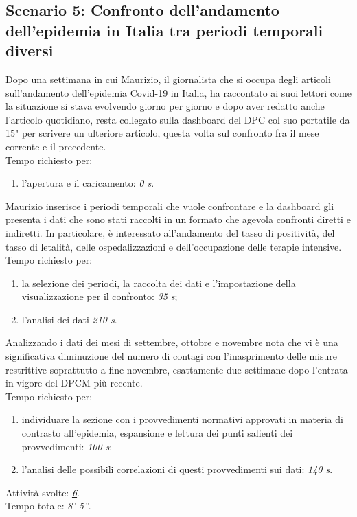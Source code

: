 \subsection{Scenario 5: Confronto dell'andamento dell'epidemia in Italia tra periodi temporali diversi}
\label{ss:scenario-5}
Dopo una settimana in cui Maurizio, il giornalista che si occupa degli articoli sull'andamento dell'epidemia Covid-19 in Italia, ha raccontato ai suoi lettori come la situazione si stava evolvendo giorno per giorno e dopo aver redatto anche l'articolo quotidiano, resta collegato sulla dashboard del DPC col suo portatile da 15" per scrivere un ulteriore articolo, questa volta sul confronto fra il mese corrente e il precedente.\\
Tempo richiesto per:
\begin{enumerate}
    \item l'apertura e il caricamento: \textit{0 s}.
\end{enumerate}

\noindent
Maurizio inserisce i periodi temporali che vuole confrontare e la dashboard gli presenta i dati che sono stati raccolti in un formato che agevola confronti diretti e indiretti. In particolare, è interessato all'andamento del tasso di positività, del tasso di letalità, delle ospedalizzazioni e dell'occupazione delle terapie intensive.\\
Tempo richiesto per:
\begin{enumerate}
    \item la selezione dei periodi, la raccolta dei dati e l'impostazione della visualizzazione per il confronto: \textit{35 s};
    \item l'analisi dei dati \textit{210 s}.
\end{enumerate}

\noindent
Analizzando i dati dei mesi di settembre, ottobre e novembre nota che vi è una significativa diminuzione del numero di contagi con l'inasprimento delle misure restrittive soprattutto a fine novembre, esattamente due settimane dopo l'entrata in vigore del DPCM più recente.\\
Tempo richiesto per:
\begin{enumerate}
    \item individuare la sezione con i provvedimenti normativi approvati in materia di contrasto all'epidemia, espansione e lettura dei punti salienti dei provvedimenti: \textit{100 s};
    \item l'analisi delle possibili correlazioni di questi provvedimenti sui dati: \textit{140 s}.
\end{enumerate}

\noindent
Attività svolte: \hyperref[itm:6]{\textit{6}}.\\ 
Tempo totale: \textit{8' 5''}. 